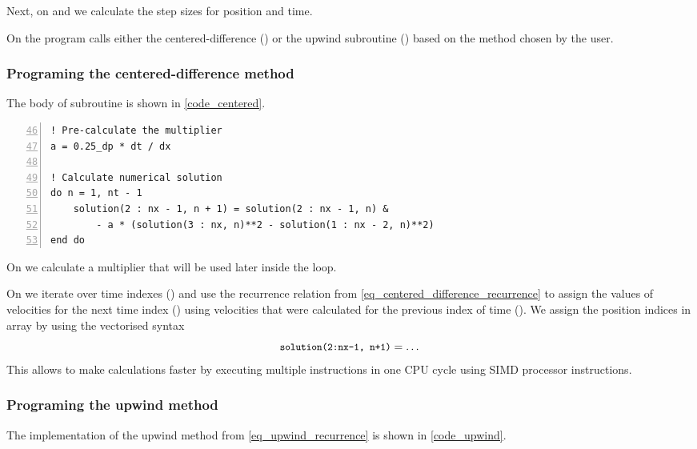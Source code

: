 Next, on  and  we calculate the step sizes for position and time.

On  the program calls either the centered-difference () or the upwind subroutine () based on the method chosen by the user.


\subsubsection{Programing the centered-difference method}

The body of  subroutine is shown in \autoref{code_centered}.

\noindent\begin{minipage}{\linewidth}
\begin{lstlisting}[caption={Code for centered-difference method of solving advection equation (\code{advection\_equation.f90}).},frame=tlrb,label={code_centered}, numbers=left, firstnumber=46]
! Pre-calculate the multiplier
a = 0.25_dp * dt / dx

! Calculate numerical solution
do n = 1, nt - 1
    solution(2 : nx - 1, n + 1) = solution(2 : nx - 1, n) &
        - a * (solution(3 : nx, n)**2 - solution(1 : nx - 2, n)**2)
end do
\end{lstlisting}
\end{minipage}

On  we calculate a multiplier that will be used later inside the loop.

On  we iterate over time indexes () and use the recurrence relation from \autoref{eq_centered_difference_recurrence} to assign the values of velocities for the next time index () using velocities that were calculated for the previous index of time (). We assign the position indices in  array by using the vectorised syntax
\[
  \texttt{\small solution(2:nx-1, n+1)} = \dots
\]
This allows to make calculations faster by executing multiple instructions in one CPU cycle using SIMD processor instructions.


\subsubsection{Programing the upwind method}

The implementation of the upwind method from \autoref{eq_upwind_recurrence} is shown in \autoref{code_upwind}.

